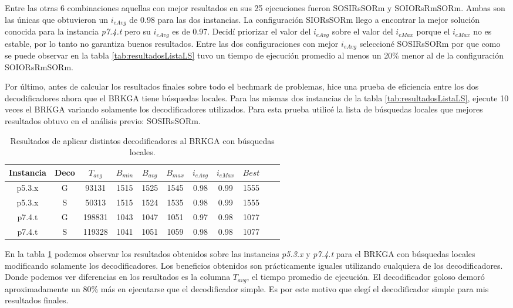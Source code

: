 \bigskip

Entre las otras 6 combinaciones aquellas con mejor resultados en sus 25 ejecuciones fueron SOSIRsSORm y SOIORsRmSORm. Ambas son las únicas que obtuvieron un $i_{eAvg}$ de 0.98 para las dos instancias. La configuración SIORsSORm llego a encontrar la mejor solución conocida para la instancia \textit{p7.4.t} pero su $i_{eAvg}$ es de 0.97. Decidí priorizar el valor del $i_{eAvg}$ sobre el valor del $i_{eMax}$ porque el $i_{eMax}$ no es estable, por lo tanto no garantiza buenos resultados. Entre las dos configuraciones con mejor $i_{eAvg}$ seleccioné SOSIRsSORm por que como se puede observar en la tabla \ref{tab:resultadosListaLS} tuvo un tiempo de ejecución promedio al menos un 20\% menor al de la configuración SOIORsRmSORm.

\bigskip

Por último, antes de calcular los resultados finales sobre todo el bechmark de problemas, hice una prueba de eficiencia entre los dos decodificadores ahora que el BRKGA tiene búsquedas locales. Para las mismas dos instancias de la tabla \ref{tab:resultadosListaLS}, ejecute 10 veces el BRKGA variando solamente los decodificadores utilizados. Para esta prueba utilicé la lista de búsquedas locales que mejores resultados obtuvo en el análisis previo: SOSIRsSORm.

\bigskip

\begin{table}
\begin{center}
\begin{tabular}{ |c|c|c|c|c|c|c|c|c|c|c| } 
\hline
Instancia & Deco & $T_{avg}$ & $B_{min}$ & $B_{avg}$ & $B_{max}$ & $i_{eAvg}$ & $i_{eMax}$ & $Best$ \\
\hline
p5.3.x & G & 93131 & 1515 & 1525 & 1545 & 0.98 & 0.99 & 1555  \\
p5.3.x & S & 50313 & 1515 & 1524 & 1535 & 0.98 & 0.99 & 1555  \\
p7.4.t & G & 198831 & 1043 & 1047 & 1051 & 0.97 & 0.98 & 1077  \\
p7.4.t & S & 119328 & 1041 & 1051 & 1059 & 0.98 & 0.98 & 1077  \\
\hline
\end{tabular}
\end{center}
\caption{Resultados de aplicar distintos decodificadores al BRKGA con búsquedas locales.}
\label{tab:testMe}
\end{table}

\bigskip

En la tabla \ref{tab:testMe} podemos observar los resultados obtenidos sobre las instancias \textit{p5.3.x} y \textit{p7.4.t} para el BRKGA con búsquedas locales modificando solamente los decodificadores. Los beneficios obtenidos son prácticamente iguales utilizando cualquiera de los decodificadores. Donde podemos ver diferencias en los resultados es la columna $T_{avg}$, el tiempo promedio de ejecución. El decodificador goloso demoró aproximadamente un 80\% más en ejecutarse que el decodificador simple. Es por este motivo que elegí el decodificador simple para mis resultados finales.

